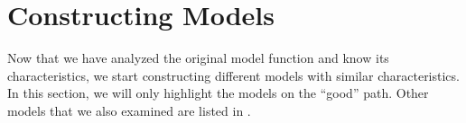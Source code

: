 \section{Constructing Models}
\label{sec:setup.models}

Now that we have analyzed the original model function and know its characteristics, we start constructing different models with similar characteristics.
In this section, we will only highlight the models on the ``good'' path.
Other models that we also examined are listed in .







